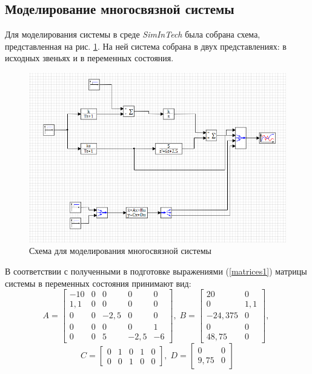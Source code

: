 	\subsection{Моделирование многосвязной системы}
	
	Для моделирования системы в среде \textit{SimInTech} была собрана схема, представленная на рис. \ref{scheme1}. На ней система собрана в двух представлениях: в исходных звеньях и в переменных состояния.
	
	\begin{figure}[h]
		\centering\includegraphics[width=.7\textwidth]{png/scheme1.png}
		\caption{Схема для моделирования многосвязной системы}
		\label{scheme1}
	\end{figure}
	
	В соответствии с полученными в подготовке выражениями (\ref{matrices1}) матрицы системы в переменных состояния принимают вид:
	\begin{equation*}
		A = \begin{bmatrix}
			-10 & 0 & 0 & 0 & 0 \\
			1,1 & 0 & 0 & 0 & 0 \\
			0 & 0 & -2,5 & 0 & 0 \\
			0 & 0 & 0 & 0 & 1 \\
			0 & 0 & 5 & -2,5 & -6
		\end{bmatrix},\;
		B = \begin{bmatrix}
			20 & 0 \\
			0 & 1,1 \\
			-24,375 & 0 \\
			0 & 0 \\
			48,75 & 0		
		\end{bmatrix},\;
	\end{equation*}
	\begin{equation*}
		C = \begin{bmatrix}
			0 & 1 & 0 & 1 & 0 \\
			0 & 0 & 1 & 0 & 0
		\end{bmatrix},\;
		D = \begin{bmatrix}
			0 & 0 \\
			9,75 & 0
		\end{bmatrix}
	\end{equation*}

